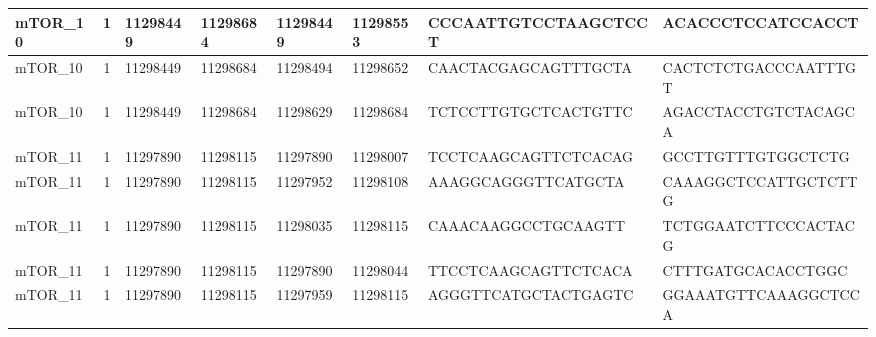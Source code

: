 \begin{landscape}
\begin{longtable}{| p{} | p{} | p{} | p{} | p{} | p{} | p{} | p{} |}
\multicolumn{1}{|l|}{mTOR\_10}   & \multicolumn{1}{c|}{1}  & \multicolumn{1}{l|}{11298449}  & \multicolumn{1}{l|}{11298684}  & \multicolumn{1}{l|}{11298449}  & \multicolumn{1}{l|}{11298553}  & \multicolumn{1}{l|}{CCCAATTGTCCTAAGCTCCT}            & \multicolumn{1}{l|}{ACACCCTCCATCCACCT}             \\ \hline
\multicolumn{1}{|l|}{mTOR\_10}   & \multicolumn{1}{c|}{1}  & \multicolumn{1}{l|}{11298449}  & \multicolumn{1}{l|}{11298684}  & \multicolumn{1}{l|}{11298494}  & \multicolumn{1}{l|}{11298652}  & \multicolumn{1}{l|}{CAACTACGAGCAGTTTGCTA}            & \multicolumn{1}{l|}{CACTCTCTGACCCAATTTGT}          \\ \hline
\multicolumn{1}{|l|}{mTOR\_10}   & \multicolumn{1}{c|}{1}  & \multicolumn{1}{l|}{11298449}  & \multicolumn{1}{l|}{11298684}  & \multicolumn{1}{l|}{11298629}  & \multicolumn{1}{l|}{11298684}  & \multicolumn{1}{l|}{TCTCCTTGTGCTCACTGTTC}            & \multicolumn{1}{l|}{AGACCTACCTGTCTACAGCA}          \\ \hline
\multicolumn{1}{|l|}{mTOR\_11}   & \multicolumn{1}{c|}{1}  & \multicolumn{1}{l|}{11297890}  & \multicolumn{1}{l|}{11298115}  & \multicolumn{1}{l|}{11297890}  & \multicolumn{1}{l|}{11298007}  & \multicolumn{1}{l|}{TCCTCAAGCAGTTCTCACAG}            & \multicolumn{1}{l|}{GCCTTGTTTGTGGCTCTG}            \\ \hline
\multicolumn{1}{|l|}{mTOR\_11}   & \multicolumn{1}{c|}{1}  & \multicolumn{1}{l|}{11297890}  & \multicolumn{1}{l|}{11298115}  & \multicolumn{1}{l|}{11297952}  & \multicolumn{1}{l|}{11298108}  & \multicolumn{1}{l|}{AAAGGCAGGGTTCATGCTA}             & \multicolumn{1}{l|}{CAAAGGCTCCATTGCTCTTG}          \\ \hline
\multicolumn{1}{|l|}{mTOR\_11}   & \multicolumn{1}{c|}{1}  & \multicolumn{1}{l|}{11297890}  & \multicolumn{1}{l|}{11298115}  & \multicolumn{1}{l|}{11298035}  & \multicolumn{1}{l|}{11298115}  & \multicolumn{1}{l|}{CAAACAAGGCCTGCAAGTT}             & \multicolumn{1}{l|}{TCTGGAATCTTCCCACTACG}          \\ \hline
\multicolumn{1}{|l|}{mTOR\_11}   & \multicolumn{1}{c|}{1}  & \multicolumn{1}{l|}{11297890}  & \multicolumn{1}{l|}{11298115}  & \multicolumn{1}{l|}{11297890}  & \multicolumn{1}{l|}{11298044}  & \multicolumn{1}{l|}{TTCCTCAAGCAGTTCTCACA}            & \multicolumn{1}{l|}{CTTTGATGCACACCTGGC}            \\ \hline
\multicolumn{1}{|l|}{mTOR\_11}   & \multicolumn{1}{c|}{1}  & \multicolumn{1}{l|}{11297890}  & \multicolumn{1}{l|}{11298115}  & \multicolumn{1}{l|}{11297959}  & \multicolumn{1}{l|}{11298115}  & \multicolumn{1}{l|}{AGGGTTCATGCTACTGAGTC}            & \multicolumn{1}{l|}{GGAAATGTTCAAAGGCTCCA}          \\ \hline

\end{longtable}
\end{landscape}
